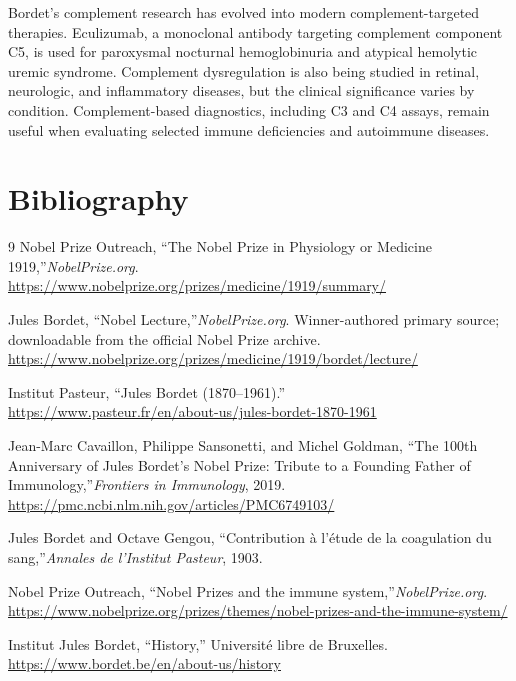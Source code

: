 Bordet's complement research has evolved into modern complement-targeted therapies. Eculizumab, a monoclonal antibody targeting complement component C5, is used for paroxysmal nocturnal hemoglobinuria and atypical hemolytic uremic syndrome. Complement dysregulation is also being studied in retinal, neurologic, and inflammatory diseases, but the clinical significance varies by condition. Complement-based diagnostics, including C3 and C4 assays, remain useful when evaluating selected immune deficiencies and autoimmune diseases.\cite{bordet-modern}


\section{Bibliography}

\begin{thebibliography}{9}
Nobel Prize Outreach, ``The Nobel Prize in Physiology or Medicine 1919,''\emph{NobelPrize.org}.\\
\url{https://www.nobelprize.org/prizes/medicine/1919/summary/}

Jules Bordet, ``Nobel Lecture,''\emph{NobelPrize.org}. Winner-authored primary source; downloadable from the official Nobel Prize archive.\\
\url{https://www.nobelprize.org/prizes/medicine/1919/bordet/lecture/}

Institut Pasteur, ``Jules Bordet (1870--1961).''\\
\url{https://www.pasteur.fr/en/about-us/jules-bordet-1870-1961}

Jean-Marc Cavaillon, Philippe Sansonetti, and Michel Goldman, ``The 100th Anniversary of Jules Bordet's Nobel Prize: Tribute to a Founding Father of Immunology,''\emph{Frontiers in Immunology}, 2019.\\
\url{https://pmc.ncbi.nlm.nih.gov/articles/PMC6749103/}

Jules Bordet and Octave Gengou, ``Contribution \`a l'\'etude de la coagulation du sang,''\emph{Annales de l'Institut Pasteur}, 1903.

Nobel Prize Outreach, ``Nobel Prizes and the immune system,''\emph{NobelPrize.org}.\\
\url{https://www.nobelprize.org/prizes/themes/nobel-prizes-and-the-immune-system/}

Institut Jules Bordet, ``History,'' Universit\'e libre de Bruxelles.\\
\url{https://www.bordet.be/en/about-us/history}
\end{thebibliography}
